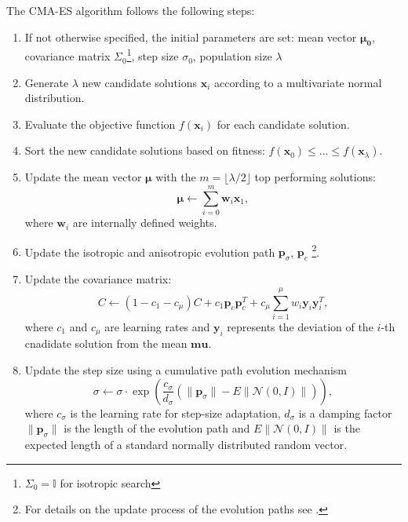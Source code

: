 The CMA-ES algorithm follows the following steps:\begin{enumerate}
    \item If not otherwise specified, the initial parameters are set: mean vector $\mathbf{\mu_0}$, covariance matrix $\Sigma_0$\footnote{$\Sigma_0=\mathbb{I}$ for isotropic search}, step size $\sigma_0$, population size $\lambda$
    \item Generate $\lambda$ new candidate solutions $\mathbf{x}_i$ according to a multivariate normal distribution.
    \item Evaluate the objective function $f(\mathbf{x}_i)$ for each candidate solution.
    \item Sort the new candidate solutions based on fitness: $f(\mathbf{x}_0) \leq ... \leq f(\mathbf{x}_{\lambda})$.
    \item Update the mean vector $\mathbf{\mu}$ with the $m=\lfloor \lambda / 2 \rfloor$ top performing solutions:\begin{equation}
        \mathbf{\mu} \leftarrow \sum_{i=0}^m \mathbf{w}_i\mathbf{x}_1,
    \end{equation} where $\mathbf{w}_i$ are internally defined weights.
    \item Update the isotropic and anisotropic evolution path $\mathbf{p}_{\sigma}$, $\mathbf{p}_c$ \footnote{For details on the update process of the evolution paths see \cite{cmaessimplepractical}.}.
    \item Update the covariance matrix: \begin{equation}
        C \leftarrow (1 - c_1 - c_{\mu}) C + c_1 \mathbf{p}_c \mathbf{p}_c^T + c_{\mu} \sum_{i=1}^{\mu} w_i \mathbf{y}_i \mathbf{y}_i^T,
    \end{equation} where $c_1$ and $c_\mu$ are learning rates and $\mathbf{y}_i$ represents the deviation of the $i$-th cnadidate solution from the mean $\mathbf{mu}$.
    \item Update the step size using a cumulative path evolution mechanism \begin{equation}
        \sigma \leftarrow \sigma \cdot \exp \left( \frac{c_{\sigma}}{d_{\sigma}} \left( \| \mathbf{p}_{\sigma} \| - E \| \mathcal{N}(0, I) \| \right) \right),
    \end{equation} where $c_\sigma$ is the learning rate for step-size adaptation, $d_\sigma$ is a damping factor $\| \mathbf{p}_{\sigma} \|$ is the length of the evolution path and $E \| \mathcal{N}(0, I) \|$ is the expected length of a standard normally distributed random vector.
\end{enumerate}


